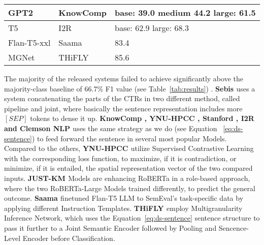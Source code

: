 \begin{table}[!tbh]
{\begin{tabular}{|l||l|l|}
    GPT2             & \cite{wang_knowcomp_2023}KnowComp                                                             & base: 39.0 medium 44.2 large: 61.5                                                       \\ \hline
    T5               & \cite{rajamanickam_i2r_2023}I2R                                                                  & base: 62.9 large: 68.3                                                                   \\ \hline
    Flan-T5-xxl      & \cite{kanakarajan_saama_2023}Saama                                                                & 83.4                                                                                     \\ \hline
    MGNet            & \cite{zhou_thifly_2023}THiFLY                                                               & 85.6                                                                                     \\ \hline
    \end{tabular}%
    }
\end{table}


The majority of the released systems failed to achieve significantly above the majority-class baseline of 66.7\%
F1 value (see Table~\ref{tab:results}) \cite{jullien_semeval-2023_nodate}.
\textbf{Sebis \cite{vladika_sebis_2023}} uses a system concatenating the parts of the CTRs in two different method, called pipeline and joint, 
where basically the sentence representation includes more $[SEP]$ tokens to dense it up.
\textbf{KnowComp \cite{wang_knowcomp_2023}, YNU-HPCC \cite{feng_ynu-hpcc_nodate}, Stanford \cite{takehana_stanford_2023}, I2R \cite{rajamanickam_i2r_2023} and Clemson NLP \cite{alameldin_clemson_nodate}} uses the same strategy as we do (see Equation ~\ref{eq:ds-sentence}) to feed forward the sentence in several most popular Models.
Compared to the others, \textbf{YNU-HPCC \cite{feng_ynu-hpcc_nodate}} utilize Supervised Contrastive Learning with the corresponding loss function, 
to maximize, if it is contradiction, or minimize, if it is entailed, the spatial representation vector of the two compared inputs.
\textbf{JUST-KM \cite{alissa_just-km_2023}} Models are enhancing RoBERTa in a role-based approach, where the two RoBERTa-Large Models trained differently, 
to predict the general outcome.
\textbf{Saama \cite{kanakarajan_saama_2023}} finetuned Flan-T5 LLM to SemEval's task-specific data by applying different Instruction Templates. 
\textbf{THiFLY \cite{zhou_thifly_2023}} employ Multigranularity Inference Network, which uses the Equation~\ref{eq:ds-sentence} sentence structure to pass
it further to a Joint Semantic Encoder followed by Pooling and Sencence-Level Encoder before Classification.


